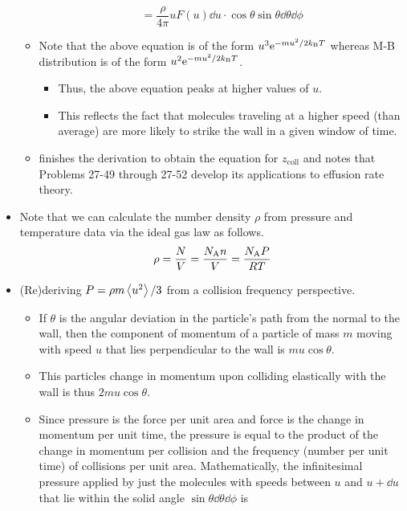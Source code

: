 \documentclass[../notes.tex]{subfiles}
\begin{document}
\begin{itemize}
\begin{itemize}
\begin{equation*}
            = \frac{\rho}{4\pi}uF(u)\dd{u}\cdot\cos\theta\sin\theta\dd{\theta}\dd{\phi}
        \end{equation*}
        \item Note that the above equation is of the form $u^3\e[-mu^2/2\kB T]$ whereas M-B distribution is of the form $u^2\e[-mu^2/2\kB T]$.
        \begin{itemize}
            \item Thus, the above equation peaks at higher values of $u$.
            \item This reflects the fact that molecules traveling at a higher speed (than average) are more likely to strike the wall in a given window of time.
        \end{itemize}
        \item \textcite{bib:McQuarrieSimon} finishes the derivation to obtain the equation for $z_\text{coll}$ and notes that Problems 27-49 through 27-52 develop its applications to effusion rate theory.
    \end{itemize}
    \item Note that we can calculate the number density $\rho$ from pressure and temperature data via the ideal gas law as follows.
    \begin{equation*}
        \rho = \frac{N}{V}
        = \frac{\NA n}{V}
        = \frac{\NA P}{RT}
    \end{equation*}
    \item (Re)deriving $P=\rho m\prb{u^2}/3$ from a collision frequency perspective.
    \begin{itemize}
        \item If $\theta$ is the angular deviation in the particle's path from the normal to the wall, then the component of momentum of a particle of mass $m$ moving with speed $u$ that lies perpendicular to the wall is $mu\cos\theta$.
        \item This particles change in momentum upon colliding elastically with the wall is thus $2mu\cos\theta$.
        \item Since pressure is the force per unit area and force is the change in momentum per unit time, the pressure is equal to the product of the change in momentum per collision and the frequency (number per unit time) of collisions per unit area. Mathematically, the infinitesimal pressure applied by just the molecules with speeds between $u$ and $u+\dd{u}$ that lie within the solid angle $\sin\theta\dd{\theta}\dd{\phi}$ is
        \begin{align*}

\end{align*}
\end{itemize}
\end{itemize}
\end{document}
